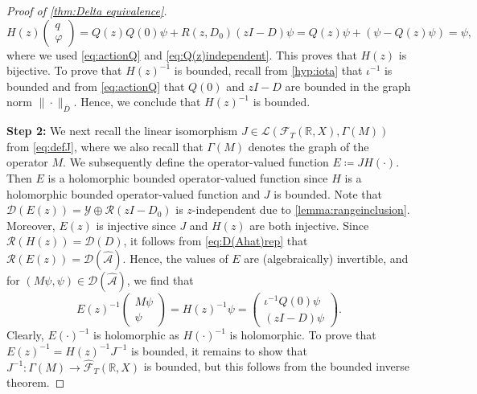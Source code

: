 \documentclass[english]{myarticle}
\begin{document}
\begin{sloppypar}
\begin{proof}[Proof of \cref{thm:Delta equivalence}]
\begin{equation*}
    H(z) \begin{pmatrix}
    q \\ \varphi
\end{pmatrix} 
= Q(z) Q(0) \psi + R(z, D_0)(zI-D)\psi = Q(z) \psi + (\psi - Q(z)\psi) = \psi,
\end{equation*}
where we used \eqref{eq:actionQ} and \eqref{eq:Q(z)independent}. This proves that $H(z)$ is bijective. To prove that $H(z)^{-1}$ is bounded, recall from \ref{hyp:iota} that $\iota^{-1}$ is bounded and from \eqref{eq:actionQ} that $Q(0)$ and $zI-D$ are bounded in the graph norm $\|\cdot\|_{\overline{D}}$. Hence, we conclude that $H(z)^{-1}$ is bounded. 

\textbf{Step 2:} We next recall the linear isomorphism $J \in \mathcal{L}(\mathcal{F}_T(\mathbb{R},X), \Gamma(M))$ from \eqref{eq:defJ}, where we also recall that $\Gamma(M)$ denotes the graph of the operator $M$. We subsequently define the operator-valued function $E \coloneqq JH(\cdot)$. Then $E$ is a holomorphic bounded operator-valued function since $H$ is a holomorphic bounded operator-valued function and $J$ is bounded. Note that $\mathcal{D}(E(z)) = \mathcal{Y} \oplus \mathcal{R}(zI-D_0)$ is $z$-independent due to \cref{lemma:rangeinclusion}. Moreover, $E(z)$ is injective since $J$ and $H(z)$ are both injective. Since $\mathcal{R}(H(z)) = \mathcal{D}(D)$, it follows from \eqref{eq:D(Ahat)rep} that $\mathcal{R}(E(z)) = \mathcal{D}(\hat{\mathcal{A}})$. Hence, the values of $E$ are (algebraically) invertible, and for $(M \psi, \psi) \in \mathcal{D}(\hat{\mathcal{A}})$, we find that
\begin{equation*}
    E(z)^{-1}
        \begin{pmatrix}
        M\psi \\
        \psi
    \end{pmatrix}
    = H(z)^{-1} \psi =
    \begin{pmatrix}
        \iota^{-1} Q(0)\psi \\
        (zI-D)\psi
    \end{pmatrix}.
\end{equation*}
Clearly, $E(\cdot)^{-1}$ is holomorphic as $H(\cdot)^{-1}$ is holomorphic. To prove that $E(z)^{-1} = H(z)^{-1}J^{-1}$ is bounded, it remains to show that $J^{-1} : \Gamma(M) \to \hat{\mathcal{F}}_T(\mathbb{R},X)$ is bounded, but this follows from the bounded inverse theorem. 


\end{proof}
\end{sloppypar}
\end{document}
